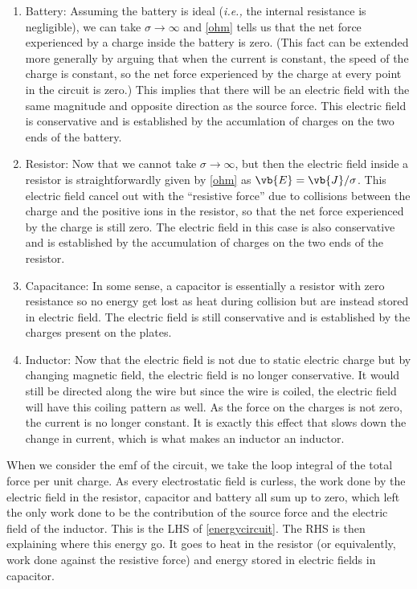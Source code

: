 \documentclass[english,a4paper,12pt]{report}
\begin{document}
\begin{enumerate}
    \item Battery: Assuming the battery is ideal (\textit{i.e.,} the internal resistance is negligible), we can take \(\sigma \rightarrow \infty\) and \cref{ohm} tells us that the net force experienced by a charge inside the battery is zero. (This fact can be extended more generally by arguing that when the current is constant, the speed of the charge is constant, so the net force experienced by the charge at every point in the circuit is zero.) This implies that there will be an electric field with the same magnitude and opposite direction as the source force. This electric field is conservative and is established by the accumlation of charges on the two ends of the battery.
    \item Resistor: Now that we cannot take \(\sigma \rightarrow \infty\), but then the electric field inside a resistor is straightforwardly given by \cref{ohm} as \(\vb{E} = \vb{J} /\sigma  \). This electric field cancel out with the ``resistive force'' due to collisions between the charge and the positive ions in the resistor, so that the net force experienced by the charge is still zero. The electric field in this case is also conservative and is established by the accumulation of charges on the two ends of the resistor.
    \item Capacitance: In some sense, a capacitor is essentially a resistor with zero resistance so no energy get lost as heat during collision but are instead stored in electric field. The electric field is still conservative and is established by the charges present on the plates. 
    \item Inductor: Now that the electric field is not due to static electric charge but by changing magnetic field, the electric field is no longer conservative. It would still be directed along the wire but since the wire is coiled, the electric field will have this coiling pattern as well. As the force on the charges is not zero, the current is no longer constant. It is exactly this effect that slows down the change in current, which is what makes an inductor an inductor.
\end{enumerate}

When we consider the emf of the circuit, we take the loop integral of the total force per unit charge. As every electrostatic field is curless, the work done by the electric field in the resistor, capacitor and battery all sum up to zero, which left the only work done to be the contribution of the source force and the electric field of the inductor. This is the LHS of \cref{energycircuit}. The RHS is then explaining where this energy go. It goes to heat in the resistor (or equivalently, work done against the resistive force) and energy stored in electric fields in capacitor. 
\end{document}
